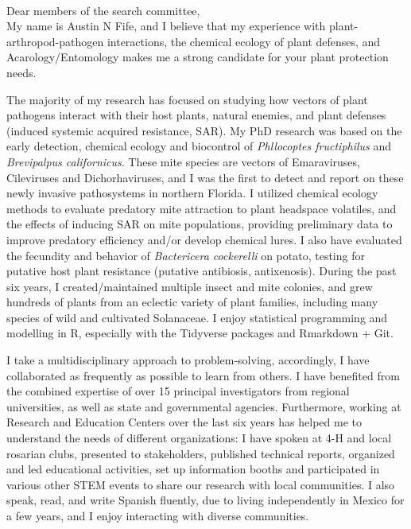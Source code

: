 \documentclass[11pt]{letter} %
\begin{document}
\begin{letter}
\\
Dear members of the search committee,\\

My name is Austin N Fife, and I believe that my experience with plant-arthropod-pathogen interactions, the chemical ecology of plant defenses, and Acarology/Entomology makes me a strong candidate for your plant protection needs.

The majority of my research has focused on studying how vectors of plant pathogens interact with their host plants, natural enemies, and plant defenses (induced systemic acquired resistance, SAR). My PhD research was based on the early detection, chemical ecology and biocontrol of \textit{Phllocoptes fructiphilus} and \textit{Brevipalpus californicus}. These mite species are vectors of Emaraviruses, Cileviruses and Dichorhaviruses, and I was the first to detect and report on these newly invasive pathosystems in northern Florida. I utilized chemical ecology methods to evaluate predatory mite attraction to plant headspace volatiles, and the effects of inducing SAR on mite populations, providing preliminary data to improve predatory efficiency and/or develop chemical lures. I also have evaluated the fecundity and behavior of \textit{Bactericera cockerelli} on potato, testing for putative host plant resistance (putative antibiosis, antixenosis). During the past six years, I created/maintained multiple insect and mite colonies, and grew hundreds of plants from an eclectic variety of plant families, including many species of wild and cultivated Solanaceae. I enjoy statistical programming and modelling in R, especially with the Tidyverse packages and Rmarkdown + Git. 

I take a multidisciplinary approach to problem-solving, accordingly, I have collaborated as frequently as possible to learn from others. I have benefited from the combined expertise of over 15 principal investigators from regional universities, as well as state and governmental agencies. Furthermore, working at Research and Education Centers over the last six years has helped me to understand the needs of different organizations: I have spoken at 4-H and local rosarian clubs, presented to stakeholders, published technical reports, organized and led educational activities, set up information booths and participated in various other STEM events to share our research with local communities. I also speak, read, and write Spanish fluently, due to living independently in Mexico for a few years, and I enjoy interacting with diverse communities. 


\end{letter}
\end{document}
